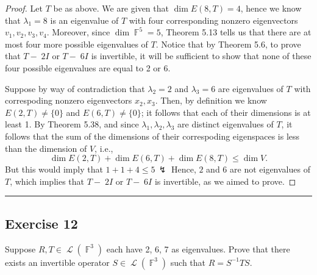 \documentclass[letterpaper, 12pt]{amsart}
\DeclareMathOperator{\F}{\mathbb{F}}				%
\DeclareMathOperator{\Ell}{\mathscr{L}}				%
\theoremstyle{definition}  							%
\begin{document}
		\begin{proof}
		Let $T$ be as above.
		We are given that $\dim{E(8, T)} = 4$, hence we know that $\lambda_{1} = 8$ is an eigenvalue of $T$ with four corresponding nonzero eigenvectors $v_{1}, v_{2}, v_{3}, v_{4}$.
		Moreover, since $\dim \F^{5} = 5$, Theorem 5.13 tells us that there are at most four more possible eigenvalues of $T$.
		Notice that by Theorem 5.6, to prove that $T-􏰋2I$ or $T-􏰋6I$ is invertible, it will be sufficient to show that none of these four possible eigenvalues are equal to 2 or 6.

		Suppose by way of contradiction that $\lambda_{2} = 2$ and $\lambda_{3} = 6$ are eigenvalues of $T$ with correspoding nonzero eigenvectors $x_{2}, x_{3}$.
		Then, by definition we know $E(2,T) \neq \{ 0 \}$ and $E(6,T) \neq \{ 0 \}$; it follows that each of their dimensions is at least 1.
		By Theorem 5.38, and since $\lambda_{1}, \lambda_{2}, \lambda_{3}$ are distinct eigenvalues of $T$, it follows that the sum of the dimensions of their correspoding eigenspaces is less than the dimension of $V$, i.e., $$\dim{E(2,T)} + \dim{E(6,T)} + \dim{E(8,T)} \leq \dim{V}.$$
		But this would imply that $1 + 1 + 4 \leq 5 \, \lightning$
		Hence, $2$ and $6$ are not eigenvalues of $T$, which implies that $T-􏰋2I$ or $T-􏰋6I$ is invertible, as we aimed to prove. 
		\end{proof}
		\vspace*{2mm}
		\hrule
		\vspace*{2mm}

		\subsection*{Exercise 12}
		Suppose $R,T \in \Ell(\F^{3})$ each have 2, 6, 7 as eigenvalues. 
		Prove that there exists an invertible operator $S \in \Ell(\F^{3})$ such that $R = S^{-1}TS$.
		\vspace*{3mm}
\end{document}
